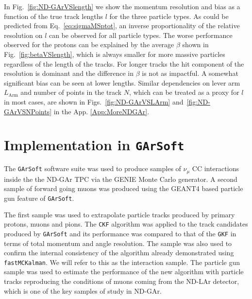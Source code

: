 In Fig.~\ref{fig:ND-GArVSlength} we show the momentum resolution and bias as a function of the true track lengths $l$ for the three particle types. As could be predicted from Eq.~\ref{eq:sigmaMSptot}, an inverse proportionality of the relative resolution on $l$ can be observed for all particle types. The worse performance observed for the protons can be explained by the average $\beta$ shown in Fig.~\ref{fig:betaVSlength}, which is always smaller for more massive particles regardless of the length of the tracks. For longer tracks the hit component of the resolution is dominant and the difference in $\beta$ is not as impactful. A somewhat significant bias can be seen at lower lengths. Similar dependencies on lever arm $L_{\textrm{Arm}}$ and number of points in the track $N$, which can be treated as a proxy for $l$ in most cases, are shown in Figs.~\ref{fig:ND-GArVSLArm} and~\ref{fig:ND-GArVSNPoints} in the App. \ref{App:MoreNDGAr}.



\section{Implementation in \texttt{GArSoft}}
\label{Sec:Garsoft_Implementation}
The \texttt{GArSoft} software suite was used to produce samples of $\nu_\mu$ CC interactions inside the the ND-GAr TPC via the GENIE Monte Carlo generator. A second sample of forward going muons was produced using the GEANT4 based particle gun feature of \texttt{GArSoft}.

The first sample was used to extrapolate particle tracks produced by primary protons, muons and pions. The \texttt{CKF} algorithm was applied to the track candidates produced by \texttt{GArSoft} and its performance was compared to that of the \texttt{GKF} in terms of total momentum and angle resolution. The sample was also used to confirm the internal consistency of the algorithm already demonstrated using \texttt{fastMCKalman}. We will refer to this as the interaction sample. The particle gun sample was used to estimate the performance of the new algorithm with particle tracks reproducing the conditions of muons coming from the ND-LAr detector, which is one of the key samples of study in ND-GAr.

